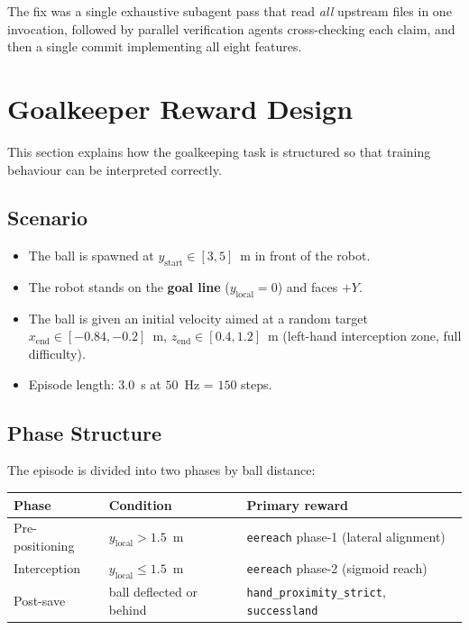 \documentclass[11pt,a4paper]{article}
\begin{document}
The fix was a single exhaustive subagent pass that read \emph{all} upstream files
in one invocation, followed by parallel verification agents cross-checking each
claim, and then a single commit implementing all eight features.

\section{Goalkeeper Reward Design}
\label{sec:goalkeeper}

This section explains how the goalkeeping task is structured so that training
behaviour can be interpreted correctly.

\subsection{Scenario}

\begin{itemize}[nosep]
  \item The ball is spawned at $y_\text{start} \in [3,5]$~m in front of the robot.
  \item The robot stands on the \textbf{goal line} ($y_\text{local} = 0$) and faces $+Y$.
  \item The ball is given an initial velocity aimed at a random target
        $x_\text{end} \in [-0.84,-0.2]$~m, $z_\text{end} \in [0.4,1.2]$~m
        (left-hand interception zone, full difficulty).
  \item Episode length: $3.0$~s at $50$~Hz = $150$ steps.
\end{itemize}

\subsection{Phase Structure}

The episode is divided into two phases by ball distance:

\begin{center}
\begin{tabular}{lll}
\toprule
\textbf{Phase} & \textbf{Condition} & \textbf{Primary reward} \\
\midrule
Pre-positioning & $y_\text{local} > 1.5$~m & \texttt{eereach} phase-1 (lateral alignment) \\
Interception    & $y_\text{local} \leq 1.5$~m & \texttt{eereach} phase-2 (sigmoid reach) \\
Post-save       & ball deflected or behind & \texttt{hand\_proximity\_strict}, \texttt{successland} \\
\bottomrule
\end{tabular}
\end{center}
\end{document}

